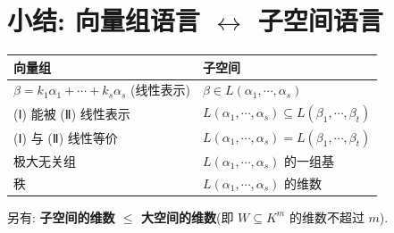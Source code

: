 \documentclass[UTF8,11pt]{ctexart}
\theoremstyle{cnthm}
\begin{document}
\section{小结: 向量组语言 $\leftrightarrow$ 子空间语言}

\begin{center}
\begin{tabular}{ll}
\hline
向量组 & 子空间\\
\hline
$\beta=k_1\alpha_1+\cdots+k_s\alpha_s$ (线性表示) & $\beta\in L(\alpha_1,\cdots,\alpha_s)$\\
(Ⅰ) 能被 (Ⅱ) 线性表示 & $L(\alpha_1,\cdots,\alpha_s)\subseteq L(\beta_1,\cdots,\beta_t)$\\
(Ⅰ) 与 (Ⅱ) 线性等价 & $L(\alpha_1,\cdots,\alpha_s)=L(\beta_1,\cdots,\beta_t)$\\
极大无关组 & $L(\alpha_1,\cdots,\alpha_s)$ 的一组基\\
秩 & $L(\alpha_1,\cdots,\alpha_s)$ 的维数\\
\hline
\end{tabular}
\end{center}

另有: \textbf{子空间的维数 $\leq$ 大空间的维数}(即 $W\subseteq K^m$ 的维数不超过 $m$).
\end{document}
